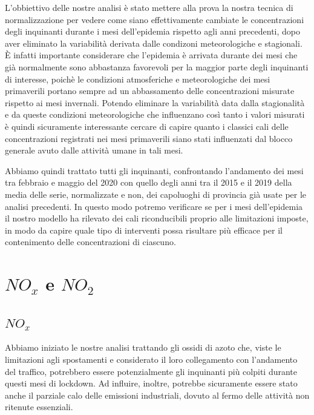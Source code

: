 \documentclass[a4paper]{report}
\begin{document}
L'obbiettivo delle nostre analisi è stato mettere alla prova la nostra tecnica di normalizzazione per vedere come siano effettivamente cambiate le concentrazioni degli inquinanti durante i mesi dell'epidemia rispetto agli anni precedenti, dopo aver eliminato la variabilità derivata dalle condizoni meteorologiche e stagionali. È infatti importante considerare che l'epidemia è arrivata durante dei mesi che già normalmente sono abbastanza favorevoli per la maggior parte degli inquinanti di interesse, poichè le condizioni atmosferiche e meteorologiche dei mesi primaverili portano sempre ad un abbassamento delle concentrazioni misurate rispetto ai mesi invernali.
Potendo eliminare la variabilità data dalla stagionalità e da queste condizioni meteorologiche che influenzano così tanto i valori misurati è quindi sicuramente interessante cercare di capire quanto i classici cali delle concentrazioni registrati nei mesi primaverili siano stati influenzati dal blocco generale avuto dalle attività umane in tali mesi.

Abbiamo quindi trattato tutti gli inquinanti, confrontando l'andamento dei mesi tra febbraio e maggio del 2020 con quello degli anni tra il 2015 e il 2019 della media delle serie, normalizzate e non, dei capoluoghi di provincia già usate per le analisi precedenti. In questo modo potremo verificare se per i mesi dell'epidemia il nostro modello ha rilevato dei cali riconducibili proprio alle limitazioni imposte, in modo da capire quale tipo di interventi possa risultare più efficace
 per il contenimento delle concentrazioni di ciascuno.

\section{$NO_x$ e $NO_2$}
\subsection{$NO_x$}
Abbiamo iniziato le nostre analisi trattando gli ossidi di azoto che, viste le limitazioni agli spostamenti e considerato il loro collegamento con l'andamento del traffico, potrebbero essere potenzialmente gli inquinanti più colpiti durante questi mesi di lockdown. Ad influire, inoltre, potrebbe sicuramente essere stato anche il parziale calo delle emissioni industriali, dovuto al fermo delle attività non ritenute essenziali.
\end{document}
